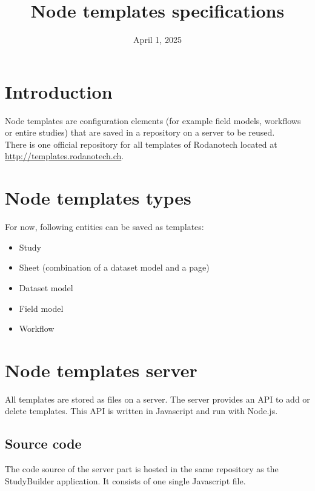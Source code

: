 \documentclass[11pt,a4paper,oneside]{article}
\begin{document}
\title{Node templates specifications}
\newcommand{\documentid}{Configurator-NodeTemplatesSpecifications}
\newcommand{\version}{DEV-SNAPSHOT}
\date{April 1, 2025}



\clearpage

\tableofcontents

\clearpage

\section{Introduction}

Node templates are configuration elements (for example field models, workflows or entire studies) that are saved in a repository on a server to be reused.\\
There is one official repository for all templates of Rodanotech located at \url{http://templates.rodanotech.ch}.\\

\section{Node templates types}
For now, following entities can be saved as templates:
\begin{itemize}
	\item Study
	\item Sheet (combination of a dataset model and a page)
	\item Dataset model
	\item Field model
	\item Workflow
\end{itemize}


\section{Node templates server}

All templates are stored as files on a server. The server provides an API to add or delete templates. This API is written in Javascript and run with Node.js.\\

\subsection{Source code}
The code source of the server part is hosted in the same repository as the StudyBuilder application. It consists of one single Javascript file.
\end{document}
